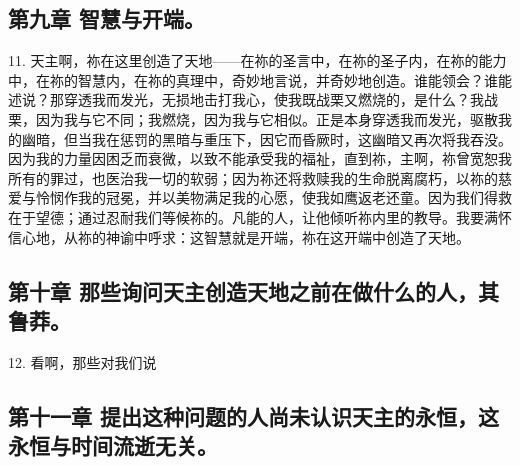 
\subsection{第九章 智慧与开端。}

11. 天主啊，祢在这里创造了天地——在祢的圣言中，在祢的圣子内，在祢的能力中，在祢的智慧内，在祢的真理中，奇妙地言说，并奇妙地创造。谁能领会？谁能述说？那穿透我而发光，无损地击打我心，使我既战栗又燃烧的，是什么？我战栗，因为我与它不同；我燃烧，因为我与它相似。正是本身穿透我而发光，驱散我的幽暗，但当我在惩罚的黑暗与重压下，因它而昏厥时，这幽暗又再次将我吞没。因为我的力量因困乏而衰微，以致不能承受我的福祉，直到祢，主啊，祢曾宽恕我所有的罪过，也医治我一切的软弱；因为祢还将救赎我的生命脱离腐朽，以祢的慈爱与怜悯作我的冠冕，并以美物满足我的心愿，使我如鹰返老还童。因为我们得救在于望德；通过忍耐我们等候祢的。凡能的人，让他倾听祢内里的教导。我要满怀信心地，从祢的神谕中呼求：这智慧就是开端，祢在这开端中创造了天地。\par


\subsection{第十章 那些询问天主创造天地之前在做什么的人，其鲁莽。}

12. 看啊，那些对我们说\par


\subsection{第十一章 提出这种问题的人尚未认识天主的永恒，这永恒与时间流逝无关。}

